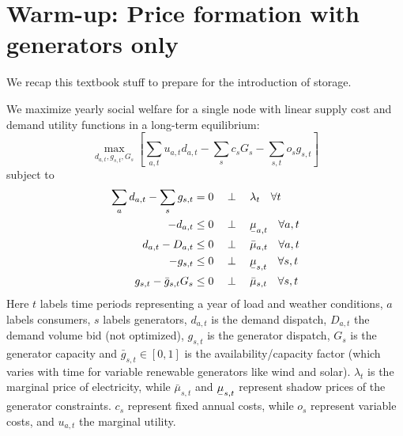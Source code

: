 \documentclass[final,3p,times]{elsarticle}
\newcommand{\ubar}[1]{\text{\b{$#1$}}}
\def\l{\lambda}
\begin{document}
\section{Warm-up: Price formation with generators only}\label{sec:generators}

We recap this textbook stuff to prepare for the introduction of storage.

We maximize yearly social welfare for a single node with linear supply cost and demand utility functions in a long-term equilibrium:
\begin{equation}
    \max_{d_{a,t}, g_{s,t}, G_s}\left[\sum_{a,t} u_{a,t} d_{a,t} -  \sum_s c_s G_s - \sum_{s,t} o_{s} g_{s,t}\right]  \label{eq:objl}
\end{equation}
subject to
\begin{align}
   \sum_a d_{a,t} - \sum_s g_{s,t} & =  0 \hspace{0.34cm}\perp \hspace{0.34cm} \l_t \hspace{0.34cm} \forall t \label{eq:balance}\\
    -d_{a,t} & \leq 0 \hspace{0.34cm}\perp \hspace{0.34cm} \ubar{\mu}_{a,t} \hspace{0.34cm} \forall a,t \\
    d_{a,t} - D_{a,t} & \leq 0 \hspace{0.34cm}\perp \hspace{0.34cm} \bar{\mu}_{a,t} \hspace{0.34cm} \forall a,t \\
    -g_{s,t} & \leq 0 \hspace{0.34cm}\perp \hspace{0.34cm} \ubar{\mu}_{s,t} \hspace{0.34cm} \forall s,t \\
         g_{s,t} - \bar{g}_{s,t} G_s & \leq 0 \hspace{0.34cm}\perp \hspace{0.34cm} \bar{\mu}_{s,t} \hspace{0.34cm} \forall s,t
\end{align}
Here $t$ labels time periods representing a year of load and weather conditions, $a$ labels consumers, $s$ labels generators, $d_{a,t}$ is the
demand dispatch, $D_{a,t}$ the demand volume bid (not optimized), $g_{s,t}$ is the generator dispatch, $G_s$ is the generator
capacity and $\bar{g}_{s,t}\in[0,1]$ is the availability/capacity factor (which
varies with time for variable renewable generators like wind and
solar). $\l_t$ is the marginal price of electricity, while
$\bar{\mu}_{s,t}$ and $\ubar{\mu}_{s,t}$ represent shadow prices of
the generator constraints. $c_s$ represent fixed annual costs, while
$o_s$ represent variable costs, and $u_{a,t}$ the marginal utility.
\end{document}
